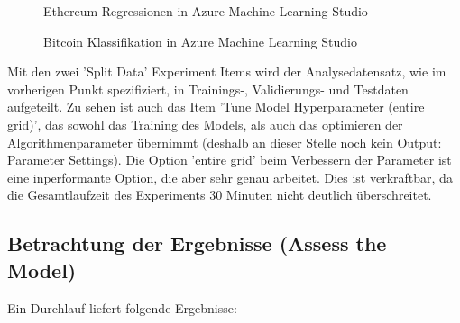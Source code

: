 \begin{figure}[H]
\centering
{}
\caption{Ethereum Regressionen in Azure Machine Learning Studio}
\label{fig:azureETHReg}
\end{figure}

\begin{figure}[H]
\centering
{}
\caption{Bitcoin Klassifikation in Azure Machine Learning Studio}
\label{fig:azureBTCClass}
\end{figure}

Mit den zwei 'Split Data' Experiment Items wird der Analysedatensatz, wie im vorherigen Punkt spezifiziert, in Trainings-, Validierungs- und Testdaten aufgeteilt. Zu sehen ist auch das Item 'Tune Model Hyperparameter (entire grid)', das sowohl das Training des Models, als auch das optimieren der Algorithmenparameter übernimmt (deshalb an dieser Stelle noch kein Output: Parameter Settings). Die Option 'entire grid' beim Verbessern der Parameter ist eine inperformante Option, die aber sehr genau arbeitet. Dies ist verkraftbar, da die Gesamtlaufzeit des Experiments 30 Minuten nicht deutlich überschreitet.

\subsection*{Betrachtung der Ergebnisse (Assess the Model)}
Ein Durchlauf liefert folgende Ergebnisse:

